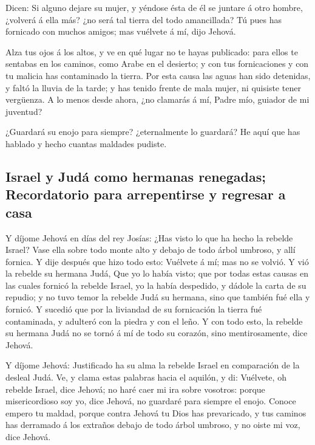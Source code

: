  Dicen: Si alguno dejare su mujer, y yéndose ésta de él se
juntare á otro hombre, ¿volverá á ella más? ¿no será tal tierra del todo
amancillada? Tú pues has fornicado con muchos amigos; mas vuélvete á mí,
dijo Jehová.

 Alza tus ojos á los altos, y ve en qué lugar no te hayas
publicado: para ellos te sentabas en los caminos, como Arabe en el
desierto; y con tus fornicaciones y con tu malicia has contaminado la
tierra.  Por esta causa las aguas han sido detenidas, y
faltó la lluvia de la tarde; y has tenido frente de mala mujer, ni
quisiste tener vergüenza.  A lo menos desde ahora, ¿no
clamarás á mí, Padre mío, guiador de mi juventud?

 ¿Guardará su enojo para siempre? ¿eternalmente lo guardará?
He aquí que has hablado y hecho cuantas maldades pudiste.

\hypertarget{israel-y-juduxe1-como-hermanas-renegadas-recordatorio-para-arrepentirse-y-regresar-a-casa}{%
\subsection{Israel y Judá como hermanas renegadas; Recordatorio para
arrepentirse y regresar a
casa}\label{israel-y-juduxe1-como-hermanas-renegadas-recordatorio-para-arrepentirse-y-regresar-a-casa}}

 Y díjome Jehová en días del rey Josías: ¿Has visto lo que
ha hecho la rebelde Israel? Vase ella sobre todo monte alto y debajo de
todo árbol umbroso, y allí fornica.  Y dije después que hizo
todo esto: Vuélvete á mí; mas no se volvió. Y vió la rebelde su hermana
Judá,  Que yo lo había visto; que por todas estas causas en
las cuales fornicó la rebelde Israel, yo la había despedido, y dádole la
carta de su repudio; y no tuvo temor la rebelde Judá su hermana, sino
que también fué ella y fornicó.  Y sucedió que por la
liviandad de su fornicación la tierra fué contaminada, y adulteró con la
piedra y con el leño.  Y con todo esto, la rebelde su
hermana Judá no se tornó á mí de todo su corazón, sino mentirosamente,
dice Jehová.

 Y díjome Jehová: Justificado ha su alma la rebelde Israel
en comparación de la desleal Judá.  Ve, y clama estas
palabras hacia el aquilón, y di: Vuélvete, oh rebelde Israel, dice
Jehová; no haré caer mi ira sobre vosotros: porque misericordioso soy
yo, dice Jehová, no guardaré para siempre el enojo.  Conoce
empero tu maldad, porque contra Jehová tu Dios has prevaricado, y tus
caminos has derramado á los extraños debajo de todo árbol umbroso, y no
oiste mi voz, dice Jehová.

